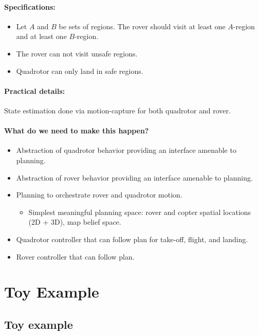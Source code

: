 \documentclass[conference]{IEEEtran}
\begin{document}
\paragraph{Specifications:}

\begin{itemize}
  \item Let $A$ and $B$ be sets of regions. The rover should visit at least one $A$-region and at least one $B$-region.
  \item The rover can not visit unsafe regions.
  \item Quadrotor can only land in safe regions.
\end{itemize}


\paragraph{Practical details:} State estimation done via motion-capture for both quadrotor and rover.


\paragraph{What do we need to make this happen?}

\begin{itemize}
  \item Abstraction of quadrotor behavior providing an interface amenable to planning.
  \item Abstraction of rover behavior providing an interface amenable to planning.
  \item Planning to orchestrate rover and quadrotor motion.
  \begin{itemize}
    \item Simplest meaningful planning space: rover and copter spatial locations (2D + 3D), map belief space.
  \end{itemize}
  \item Quadrotor controller that can follow plan for take-off, flight, and landing.
  \item Rover controller that can follow plan.
\end{itemize}

\section{Toy Example}

\subsection{Toy example}
\end{document}
